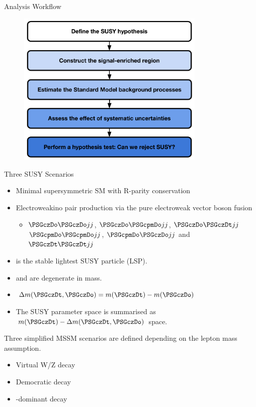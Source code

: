 \begin{frame}[fragile]{Analysis Workflow}
  \begin{figure}[htpb]
    \centering
    \includegraphics[width=0.8\textwidth]{fig/analysis-workflow.pdf}
  \end{figure}
\end{frame}

\begin{frame}[fragile]{Three SUSY Scenarios}
  \begin{itemize}
    \item Minimal supersymmetric SM with R-parity conservation
    \item Electroweakino pair production via the pure electroweak vector boson fusion
      \begin{itemize}
        \item \(\PSGczDo\PSGczDo jj\), \(\PSGczDo\PSGcpmDo jj\), \(\PSGczDo\PSGczDt jj\) \(\PSGcpmDo\PSGcpmDo jj\), \(\PSGcpmDo\PSGczDo jj\) and \(\PSGczDt\PSGczDt jj\)
      \end{itemize}
    \item \PSGczDo is the stable lightest SUSY particle (LSP).
    \item \PSGczDt and \PSGcpmDo are degenerate in mass.
    \item \(\Delta m (\PSGczDt, \PSGczDo) = m(\PSGczDt) - m(\PSGczDo) \)
    \item The SUSY parameter space is summarised as \(m(\PSGczDt) - \Delta  m (\PSGczDt, \PSGczDo)\) space.
  \end{itemize}

  Three simplified MSSM scenarios are defined depending on the lepton mass assumption.
  \begin{itemize}
    \item Virtual W/Z decay
    \item Democratic \PSl decay
    \item {\PSGt}-dominant decay
  \end{itemize}
\end{frame}

